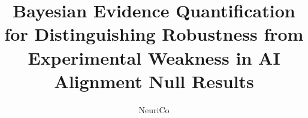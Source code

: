 \documentclass{article}
\title{Bayesian Evidence Quantification for Distinguishing Robustness from Experimental Weakness in AI Alignment Null Results}
\author{NeuriCo}
\begin{document}
\maketitle

\begin{abstract}

\end{abstract}











\appendix

\end{document}

